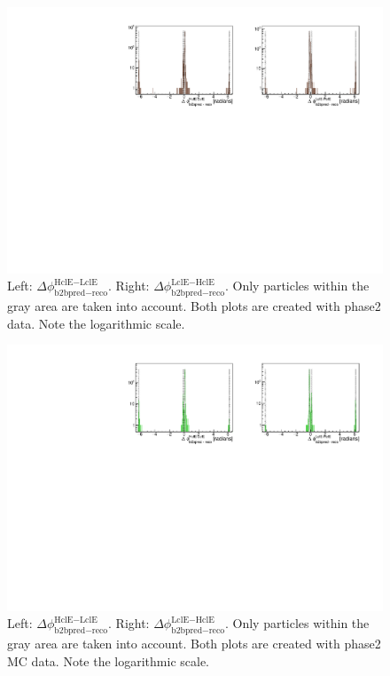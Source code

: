 \documentclass[a4paper,11pt,twosided,final,german,openbib,pdftex,listof=totoc,bibliography=totoc]{scrbook}
\begin{document}
\begin{appendix}
\begin{figure}[h!]
	\centering
	\includegraphics[width=\textwidth]{Plots/master/sb2b_Data_0.pdf}
	\caption[b2bClusterPhi - clusterPhi For Phase2 Data (Whole Range)]{Left: $\Delta \phi _{\textrm{b2bpred} - \textrm{reco}}^{\textrm{HclE}-\textrm{LclE}}$. Right:  $\Delta \phi _{\textrm{b2bpred} - \textrm{reco}}^{\textrm{LclE}-\textrm{HclE}}$. Only particles within the gray area are taken into account. Both plots are created with phase2 data. Note the logarithmic scale.}
	\label{fig:b2bData_Whole}
\end{figure}






\begin{figure}[!htbp]
	\centering
	\includegraphics[width=\textwidth]{Plots/master/sb2b_MC_0.pdf}
	\caption[b2bClusterPhi - clusterPhi For Phase2 MC (Whole Range)]{Left: $\Delta \phi _{\textrm{b2bpred} - \textrm{reco}}^{\textrm{HclE}-\textrm{LclE}}$. Right:  $\Delta \phi _{\textrm{b2bpred} - \textrm{reco}}^{\textrm{LclE}-\textrm{HclE}}$. Only particles within the gray area are taken into account. Both plots are created with phase2 MC data. Note the logarithmic scale.}
	\label{fig:b2bMC_Whole}
\end{figure}
\newpage




\end{appendix}
\end{document}
